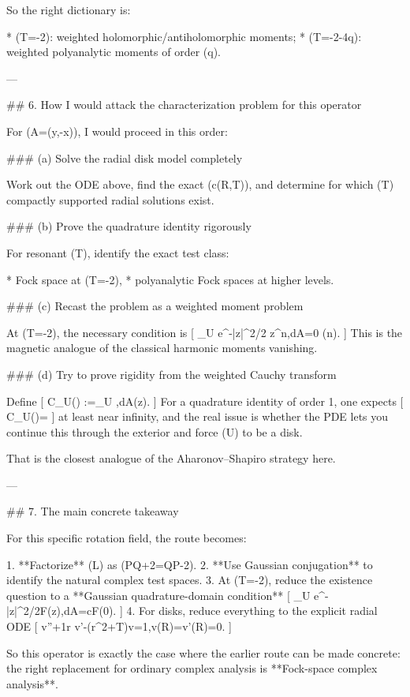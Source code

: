So the right dictionary is:

* (T=-2): weighted holomorphic/antiholomorphic moments;
* (T=-2-4q): weighted polyanalytic moments of order (q).

---

## 6. How I would attack the characterization problem for this operator

For (A=(y,-x)), I would proceed in this order:

### (a) Solve the radial disk model completely

Work out the ODE above, find the exact (c(R,T)), and determine for which (T) compactly supported radial solutions exist.

### (b) Prove the quadrature identity rigorously

For resonant (T), identify the exact test class:

* Fock space at (T=-2),
* polyanalytic Fock spaces at higher levels.

### (c) Recast the problem as a weighted moment problem

At (T=-2), the necessary condition is
[
\int_U e^{-|z|^2/2} z^n,dA=0 \quad (n).
]
This is the magnetic analogue of the classical harmonic moments vanishing.

### (d) Try to prove rigidity from the weighted Cauchy transform

Define
[
\mathcal C_U(\zeta)
:=\pi\int_U ,dA(z).
]
For a quadrature identity of order 1, one expects
[
\mathcal C_U(\zeta)=
]
at least near infinity, and the real issue is whether the PDE lets you continue this through the exterior and force (U) to be a disk.

That is the closest analogue of the Aharonov–Shapiro strategy here.

---

## 7. The main concrete takeaway

For this specific rotation field, the route becomes:

1. **Factorize** (L) as (PQ+2=QP-2).
2. **Use Gaussian conjugation** to identify the natural complex test spaces.
3. At (T=-2), reduce the existence question to a **Gaussian quadrature-domain condition**
   [
   \int_U e^{-|z|^2/2}F(z),dA=cF(0).
   ]
4. For disks, reduce everything to the explicit radial ODE
   [
   v''+\frac1r v'-(r^2+T)v=1,\quad v(R)=v'(R)=0.
   ]

So this operator is exactly the case where the earlier route can be made concrete: the right replacement for ordinary complex analysis is **Fock-space complex analysis**.

